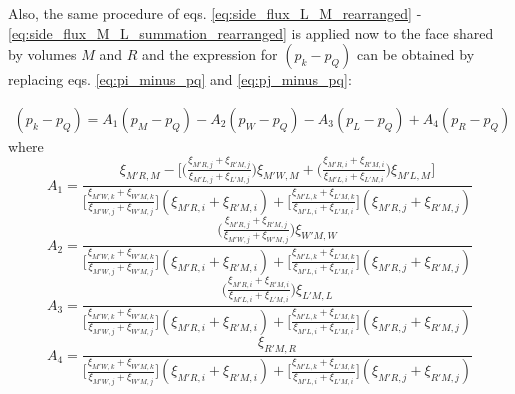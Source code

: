 \documentclass{article}
\begin{document}
Also, the same procedure of eqs. \ref{eq:side_flux_L_M_rearranged} - \ref{eq:side_flux_M_L_summation_rearranged} is applied now to the face shared by volumes $ M $ and $ R $ and the expression for $ (p_{k} - p_{Q}) $ can be obtained by replacing eqs. \ref{eq:pi_minus_pq} and \ref{eq:pj_minus_pq}:

\begin{equation} \label{eq:pk_minus_pq}
\begin{split}
(p_{k} - p_{Q}) = A_{1}(p_{M}- p_{Q})-A_{2}(p_{W} - p_{Q}) - A_{3}(p_{L} -p_{Q})+A_{4}(p_{R} - p_{Q})
\end{split}
\end{equation}
where
\begin{displaymath}
	A_{1} = \frac{\xi_{M'R,M} -\Bigg[\Bigg(\frac{\xi_{M'R,j}+\xi_{R'M,j}}{\xi_{M'L,j}+\xi_{L'M,j}}\Bigg)\xi_{M'W,M}+\Bigg(\frac{\xi_{M'R,i}+\xi_{R'M,i}}{\xi_{M'L,i}+\xi_{L'M,i}}\Bigg)\xi_{M'L,M}\Bigg]}{\Bigg[\frac{\xi_{M'W,k} + \xi_{W'M,k}}{\xi_{M'W,j} + \xi_{W'M,j}} \Bigg](\xi_{M'R,i} + \xi_{R'M,i}) + \Bigg[ \frac{\xi_{M'L,k} + \xi_{L'M,k}}{\xi_{M'L,i} + \xi_{L'M,i}} \Bigg](\xi_{M'R,j}+\xi_{R'M,j})}
\end{displaymath}
\begin{displaymath}
	A_{2} = \frac{\Bigg(\frac{\xi_{M'R,j}+\xi_{R'M,j}}{\xi_{M'W,j}+\xi_{W'M,j}}\Bigg)\xi_{W'M,W}}{\Bigg[\frac{\xi_{M'W,k} + \xi_{W'M,k}}{\xi_{M'W,j} + \xi_{W'M,j}} \Bigg](\xi_{M'R,i} + \xi_{R'M,i}) + \Bigg[ \frac{\xi_{M'L,k} + \xi_{L'M,k}}{\xi_{M'L,i} + \xi_{L'M,i}} \Bigg](\xi_{M'R,j}+\xi_{R'M,j})}
\end{displaymath}
\begin{displaymath}
	A_{3} = \frac{\Bigg(\frac{\xi_{M'R,i}+\xi_{R'M,i}}{\xi_{M'L,i}+\xi_{L'M,i}}\Bigg)\xi_{L'M,L}}{\Bigg[\frac{\xi_{M'W,k} + \xi_{W'M,k}}{\xi_{M'W,j} + \xi_{W'M,j}} \Bigg](\xi_{M'R,i} + \xi_{R'M,i}) + \Bigg[ \frac{\xi_{M'L,k} + \xi_{L'M,k}}{\xi_{M'L,i} + \xi_{L'M,i}} \Bigg](\xi_{M'R,j}+\xi_{R'M,j})}
\end{displaymath}
\begin{displaymath}
	A_{4} = \frac{\xi_{R'M,R}}{\Bigg[\frac{\xi_{M'W,k} + \xi_{W'M,k}}{\xi_{M'W,j} + \xi_{W'M,j}} \Bigg](\xi_{M'R,i} + \xi_{R'M,i}) + \Bigg[ \frac{\xi_{M'L,k} + \xi_{L'M,k}}{\xi_{M'L,i} + \xi_{L'M,i}} \Bigg](\xi_{M'R,j}+\xi_{R'M,j})}
\end{displaymath}
\end{document}
